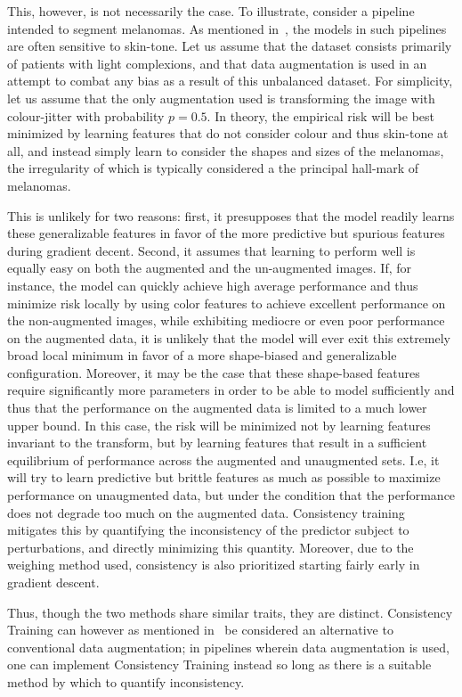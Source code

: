     This, however, is not necessarily the case. To illustrate, consider a pipeline intended to segment melanomas. As mentioned in~, the models in such pipelines are often sensitive to skin-tone. Let us assume that the dataset consists primarily of patients with light complexions, and that data augmentation is used in an attempt to combat any bias as a result of this unbalanced dataset. For simplicity, let us assume that the only augmentation used is transforming the image with colour-jitter with probability \(p=0.5\). In theory, the empirical risk will be best minimized by learning features that do not consider colour and thus skin-tone at all, and instead simply learn to consider the shapes and sizes of the melanomas, the irregularity of which is typically considered a the principal hall-mark of melanomas. 
    
    This is unlikely for two reasons: first, it presupposes that the model readily learns these generalizable features in favor of the more predictive but spurious features during gradient decent. Second, it assumes that learning to perform well is equally easy on both the augmented and the un-augmented images. If, for instance, the model can quickly achieve high average performance and thus minimize risk locally by using color features to achieve excellent performance on the non-augmented images, while exhibiting mediocre or even poor performance on the augmented data, it is unlikely that the model will ever exit this extremely broad local minimum in favor of a more shape-biased and generalizable configuration. Moreover, it may be the case that these shape-based features require significantly more parameters in order to be able to model sufficiently and thus that the performance on the augmented data is limited to a much lower upper bound. In this case, the risk will be minimized not by learning features invariant to the transform, but by learning features that result in a sufficient equilibrium of performance across the augmented and unaugmented sets. I.e, it will try to learn predictive but brittle features as much as possible to maximize performance on unaugmented data, but under the condition that the performance does not degrade too much on the augmented data. Consistency training mitigates this by quantifying the inconsistency of the predictor subject to perturbations, and directly minimizing this quantity. Moreover, due to the weighing method used, consistency is also prioritized starting fairly early in gradient descent. 
    
    Thus, though the two methods share similar traits, they are distinct. Consistency Training can however as mentioned in~ be considered an alternative to conventional data augmentation; in pipelines wherein data augmentation is used, one can implement Consistency Training instead so long as there is a suitable method by which to quantify inconsistency. 

